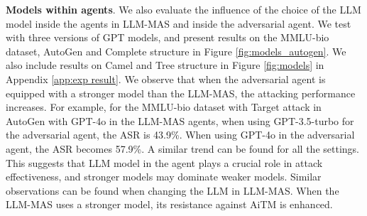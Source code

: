 \begin{table}[]
\centering
\caption{Attack results on persuasiveness}
\label{tab:persuasive}
\end{table}

\noindent \textbf{Models within agents}. We also evaluate the influence of the choice of the LLM model inside the agents in LLM-MAS and inside the adversarial agent. We test with three versions of GPT models, and present results on the MMLU-bio dataset, AutoGen and Complete structure in Figure \ref{fig:models_autogen}. We also include results on Camel and Tree structure in Figure \ref{fig:models} in Appendix \ref{app:exp result}. We observe that when the adversarial agent is equipped with a stronger model than the LLM-MAS, the attacking performance increases. For example, for the MMLU-bio dataset with Target attack in AutoGen with GPT-4o in the LLM-MAS agents, when using GPT-3.5-turbo for the adversarial agent, the ASR is 43.9\%. When using GPT-4o in the adversarial agent, the ASR becomes 57.9\%. A similar trend can be found for all the settings. This suggests that LLM model in the agent plays a crucial role in attack effectiveness, and stronger models may dominate weaker models. Similar observations can be found when changing the LLM in LLM-MAS. When the LLM-MAS uses a stronger model, its resistance against AiTM is enhanced.

